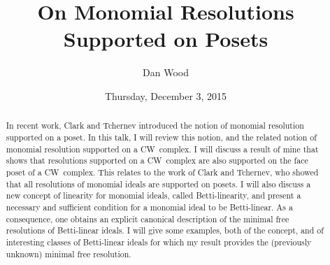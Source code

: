 \documentclass{UAmathtalk}
\author{Dan Wood}
\title{On Monomial Resolutions\\ Supported on Posets}
\date{Thursday, December 3, 2015}
\begin{document}
\maketitle

\begin{abstract}
In recent work, Clark and Tchernev introduced the notion of monomial resolution supported on a poset. In this talk, I will review this notion, and the related notion of monomial resolution supported on a CW~complex. I will discuss a result of mine that shows that resolutions supported on a CW~complex are also supported on the face poset of a CW~complex. This relates to the work of Clark and Tchernev, who showed that all resolutions of monomial ideals are supported on posets. I will also discuss a new concept of linearity for monomial ideals, called Betti-linearity, and present a necessary and sufficient condition for a monomial ideal to be Betti-linear. As a consequence, one obtains an explicit canonical description of the minimal free resolutions of Betti-linear ideals. I will give some examples, both of the concept, and of interesting classes of Betti-linear ideals for which my result provides the (previously unknown) minimal free resolution.
\end{abstract}
\end{document}
